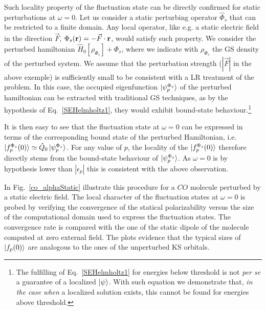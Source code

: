 \documentclass[reprint,aps,prb]{revtex4-1}
\renewcommand{\r}{{\bf r}}
\newcommand{\eps}{\epsilon}
\newcommand{\op}[1]{\hat {#1}}
\newcommand{\dmnot}{\op{\rho}_0}
\newcommand{\hnot}{\op{H}_0}
\begin{document}
Such locality property of the fluctuation state can be directly confirmed for static perturbations at $\omega=0$.
Let us consider a static perturbing operator $\op\Phi_s$ that can be restricted to a finite domain. 
Any local operator, like e.g. a static electric field in the direction $\vec F$, $\Phi_s(\r) = -\vec F \cdot \r$, would satisfy such property.
We consider the perturbed hamiltonian $\hnot[\rho_{\Phi_s}] + \Phi_s$, where we indicate with $\rho_{\Phi_s}$ the GS density of the
perturbed system. We assume that the perturbation strength ($|\vec F|$ in the above exemple) is sufficiently small to be consistent with a LR 
treatment of the problem. 
In this case, the occupied eigenfunction $\ket{\psi_p^{\Phi_s}}$ of the perturbed hamiltonian 
can be extracted with traditional GS techniques, as by the hypothesis of Eq.~\eqref{SEHelmholtz1},
they would exhibit bound-state behaviour.\footnote{The fulfilling of Eq.~\eqref{SEHelmholtz1} for energies below threshold
is not \textit{per se} a guarantee of a localized $\ket{\psi}$. With such equation we demonstrate that, \emph{in the case when} a localized
solution exists, this cannot be found for energies above threshold.}

It is then easy to see that the fluctuation state at $\omega=0$ can be expressed
in terms of the corresponding bound state of the perturbed Hamiltonian, i.e.
$\ket{f_p^{\Phi_s}(0)} \simeq \op Q_0 \ket{\psi_p^{\Phi_s}}$.
For any value of $p$, the locality of the $\ket{f_p^{\Phi_s}(0)}$ therefore directly stems from the
bound-state behaviour of $\ket{\psi_p^{\Phi_s}}$. As $\omega=0$ is by hypothesis 
lower than $|\eps_p|$ this is consistent with the above observation.

In Fig.~\eqref{co_alphaStatic} illustrate this procedure for a $CO$ molecule 
perturbed by a static electric field. The local character of the fluctuation states at $\omega=0$ is 
probed by verifying the convergence of the statical polarizability versus 
the size of the computational domain used to express the fluctuation states. The convergence rate is compared with the 
one of the static dipole of the molecule computed at zero external field. 
The plots evidence that the typical sizes of $\ket{f_p(0)}$ are analogous to the ones of the unperturbed KS orbitals. 
\end{document}
